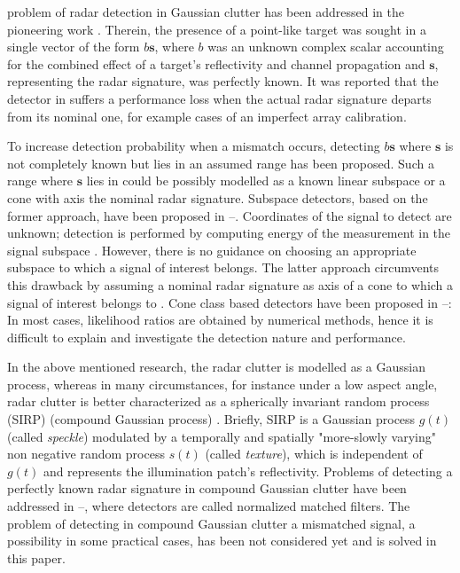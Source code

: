  problem of radar detection in Gaussian clutter
has been addressed in the
pioneering work \cite{Kelly86}. Therein, the
presence of a point-like target was sought in a single vector
of the form $b \boldsymbol{s}$, where
$b$ was an unknown complex scalar accounting
for the combined effect of  a target's reflectivity and channel propagation and
$\boldsymbol{s}$, representing the radar signature, was perfectly known.
It was reported that
the detector in \cite{Kelly86} suffers a
performance loss when
the actual radar signature
departs from its nominal one, for example cases of
an imperfect array calibration.

 To increase detection probability when a mismatch occurs,
 detecting $b \boldsymbol{s}$ where $\boldsymbol{s}$ is not completely known but lies
 in an assumed range has been proposed.
Such a range where $\boldsymbol{s}$ lies in could be possibly
modelled as a known linear subspace or a cone with axis the nominal radar signature.
Subspace detectors, based on the former approach, have been proposed in
 \cite{Scharf94}--\cite{Aubry_Jul14}.
 Coordinates of the signal to detect %
 are unknown; detection is performed
    by computing energy
of the measurement in the signal subspace \cite{Scharf94}.
However, there is no guidance on choosing an appropriate subspace to which
a signal of interest belongs.
The latter approach circumvents this drawback by
assuming a nominal radar signature as axis of a cone to which
a signal of interest belongs to \cite{Ramprashad96}.
Cone class based detectors
have been proposed in \cite{DeMaio05}--\cite{DeMaio09}:
In most cases, likelihood ratios
are obtained by numerical
methods, hence
it is difficult
to explain and investigate the detection
nature and performance.

 In the above mentioned research, the radar clutter is modelled as a
 Gaussian process, whereas
 in many circumstances, for instance under a low aspect angle,
  radar clutter is
   better characterized as a
 spherically invariant random process (SIRP)
 (compound Gaussian process) \cite{Conte87}\cite{Ward90}.
 Briefly, SIRP is
   a Gaussian process $g(t)$ (called \textit{speckle})
modulated by a temporally and spatially "more-slowly varying"
non negative random process $s(t)$ (called \textit{texture}), 
which is independent of $g(t)$ and represents the
 illumination patch's reflectivity.
 Problems of detecting a perfectly known 
 radar signature in compound Gaussian clutter%
have been addressed in
 \cite{Conte95}--\cite{Rabaste_Jul14}, where detectors are called
 normalized matched filters.
 The problem of detecting in compound Gaussian clutter
  a mismatched signal, a possibility in
 some practical cases, has been not considered yet and
 is solved %
 in this paper.

